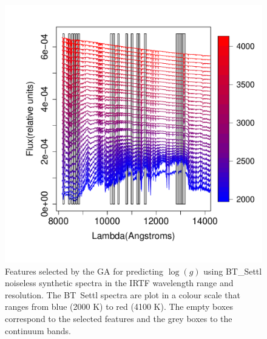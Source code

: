\begin {figure}
 \centering
  \includegraphics[scale=0.55]{figs/BT-spectraAtIRTF-Inf-logg}
  \caption{Features selected by the GA for predicting $\log(g)$ using
    BT\_Settl noiseless synthetic spectra in the IRTF wavelength range
    and resolution. The BT\ Settl spectra are plot in a colour scale
    that ranges from blue (2000 K) to red (4100 K). The empty boxes
    correspond to the selected features and the grey boxes to the
    continuum bands.}
\label{fig:irtf-teff}
\end {figure}


